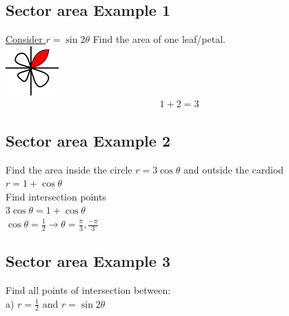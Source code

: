 \documentclass[12pt]{article}
\begin{document}
\subsection{Sector area Example 1}
\underline{Consider $r=\sin2\theta$} Find the area of one leaf/petal.\\%
\includegraphics{areaofpolarregionex1}
\begin{align}
	1+2=3	
\end{align}

\subsection{Sector area Example 2}
Find the area inside the circle \underline{$r=3\cos\theta$} and outside the cardiod\\\underline{$r=1+\cos\theta$} \\%
Find intersection points\\%
$3\cos\theta = 1+\cos\theta$\\%
$\cos\theta=\frac{1}{2}\rightarrow\theta=\frac{\pi}{3},\frac{-\pi}{3}$

\subsection{Sector area Example 3}
Find all points of intersection between:\\%
a) $r=\frac{1}{2}$ and $r=\sin2\theta$
\end{document}
